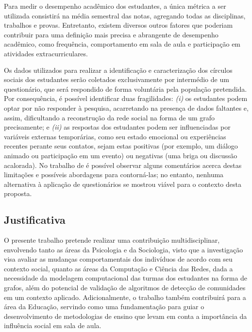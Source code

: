 Para medir o desempenho acadêmico dos estudantes, a única métrica a ser utilizada consistirá na média semestral das notas, agregando todas as disciplinas, trabalhos e provas. Entretanto, existem diversos outros fatores que poderiam contribuir para uma definição mais precisa e abrangente de desempenho acadêmico, como frequência, comportamento em sala de aula e participação em atividades extracurriculares.

Os dados utilizados para realizar a identificação e caracterização dos círculos sociais dos estudantes serão coletados exclusivamente por intermédio de um questionário, que será respondido de forma voluntária pela população pretendida. Por consequência, é possível identificar duas fragilidades: \textit{(i)} os estudantes podem optar por não responder à pesquisa, acarretando na presença de dados faltantes e, assim, dificultando a reconstrução da rede social na forma de um grafo precisamente; e \textit{(ii)} as respostas dos estudantes podem ser influenciadas por variáveis externas temporárias, como seu estado emocional ou experiências recentes perante seus contatos, sejam estas positivas (por exemplo, um diálogo animado ou participação em um evento) ou negativas (uma briga ou discussão acalorada). No trabalho de  é possível observar alguns comentários acerca destas limitações e possíveis abordagens para contorná-las; no entanto, nenhuma alternativa à aplicação de questionários se mostrou viável para o contexto desta proposta.

\subsection{Justificativa} \label{sec:justification}

O presente trabalho pretende realizar uma contribuição multidisciplinar, envolvendo tanto as áreas da Psicologia e da Sociologia, visto que a investigação visa avaliar as mudanças comportamentais dos indivíduos de acordo com seu contexto social, quanto as áreas da Computação e Ciência das Redes, dada a necessidade da modelagem computacional das turmas dos estudantes na forma de grafos, além do potencial de validação de algoritmos de detecção de comunidades em um contexto aplicado. Adicionalmente, o trabalho também contribuirá para a área da Educação, servindo como uma fundamentação para guiar o desenvolvimento de metodologias de ensino que levam em conta a importância da influência social em sala de aula.

